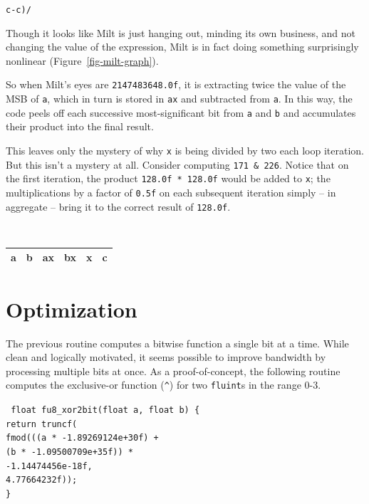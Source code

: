\documentclass{acmsiggraph}
\theoremstyle{remark}
\theoremstyle{definition}
\begin{document}
\begin{center}
\huge
{\tt c-c)/}
\end{center}



Though it looks like Milt is just hanging out, minding its own business, and not changing the value of the expression,
Milt is in fact doing something surprisingly nonlinear (Figure~\ref{fig-milt-graph}).



So when Milt's eyes are {\tt 2147483648.0f}, it is extracting twice the value of the MSB of {\tt a},
which in turn is stored in {\tt ax} and subtracted from {\tt a}.
In this way, the code peels off each successive most-significant bit from {\tt a} and {\tt b} and accumulates their product into the final result.

This leaves only the mystery of why {\tt x} is being divided by two each loop iteration.
But this isn't a mystery at all.
Consider computing {\tt 171 \& 226}.
Notice that on the first iteration, the product {\tt 128.0f * 128.0f} would be added to {\tt x};
the multiplications by a factor of {\tt 0.5f} on each subsequent iteration simply -- in aggregate -- bring it to the correct result of {\tt 128.0f}.

{ \tt
\begin{tabular}{r|r|r|r|r|r}
\multicolumn{1}{c|}{a} &
\multicolumn{1}{c|}{b} &
\multicolumn{1}{c|}{ax} &
\multicolumn{1}{c|}{bx} &
\multicolumn{1}{c|}{x} &
\multicolumn{1}{c}{c} \\\hline

\end{tabular}
}


\section{Optimization}

The previous routine computes a bitwise function a single bit at a
time. While clean and logically motivated, it seems possible to
improve bandwidth by processing multiple bits at once. As a
proof-of-concept, the following routine computes the exclusive-or
function (\verb+^+) for two {\tt fluint}s in the range $0$-$3$.

{ \tt
float fu8\_xor2bit(float a, float b) \{ \\
\phantom{XX}return truncf( \\
\phantom{XXXX}fmod(((a * -1.89269124e+30f) + \\
\phantom{XXXXXXXXXX}(b * -1.09500709e+35f)) * \\
\phantom{XXXXXXXXXXXX}-1.14474456e-18f, \\
\phantom{XXXXXXXXXX}4.77664232f)); \\
\}
}
\end{document}
